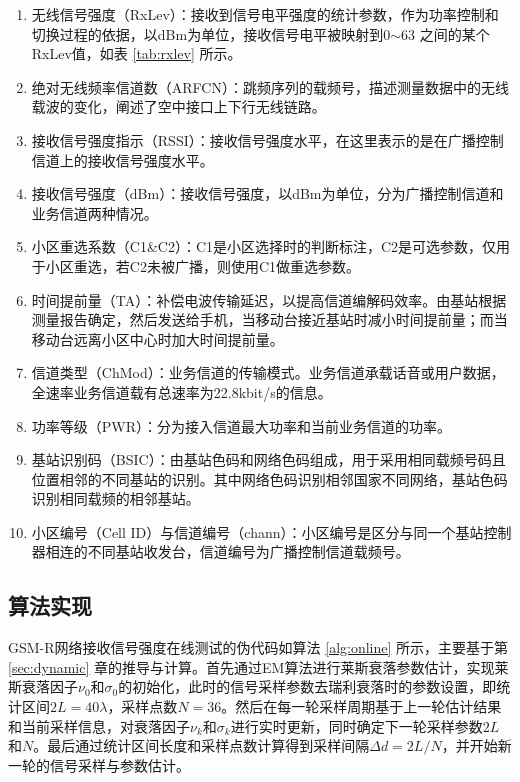\begin{enumerate}
  \item 无线信号强度（RxLev）：接收到信号电平强度的统计参数，作为功率控制和切换过程的依据，以dBm为单位，接收信号电平被映射到0$\sim$63 之间的某个RxLev值，如表 \ref{tab:rxlev} 所示。
  \item 绝对无线频率信道数（ARFCN）：跳频序列的载频号，描述测量数据中的无线载波的变化，阐述了空中接口上下行无线链路。
  \item 接收信号强度指示（RSSI）：接收信号强度水平，在这里表示的是在广播控制信道上的接收信号强度水平。
  \item 接收信号强度（dBm）：接收信号强度，以dBm为单位，分为广播控制信道和业务信道两种情况。
  \item 小区重选系数（C1\&C2）：C1是小区选择时的判断标注，C2是可选参数，仅用于小区重选，若C2未被广播，则使用C1做重选参数。
  \item 时间提前量（TA）：补偿电波传输延迟，以提高信道编解码效率。由基站根据测量报告确定，然后发送给手机，当移动台接近基站时减小时间提前量；而当移动台远离小区中心时加大时间提前量。
  \item 信道类型（ChMod）：业务信道的传输模式。业务信道承载话音或用户数据，全速率业务信道载有总速率为22.8kbit/s的信息。
  \item 功率等级（PWR）：分为接入信道最大功率和当前业务信道的功率。
  \item 基站识别码（BSIC）：由基站色码和网络色码组成，用于采用相同载频号码且位置相邻的不同基站的识别。其中网络色码识别相邻国家不同网络，基站色码识别相同载频的相邻基站。
  \item 小区编号（Cell ID）与信道编号（chann）：小区编号是区分与同一个基站控制器相连的不同基站收发台，信道编号为广播控制信道载频号。
\end{enumerate}

\subsection{算法实现}
\label{sec:alggsmr}

GSM-R网络接收信号强度在线测试的伪代码如算法 \ref{alg:online} 所示，主要基于第 \ref{sec:dynamic} 章的推导与计算。首先通过EM算法进行莱斯衰落参数估计，实现莱斯衰落因子$\nu_0$和$\sigma_0$的初始化，此时的信号采样参数去瑞利衰落时的参数设置，即统计区间$2L=40\lambda$，采样点数$N=36$。然后在每一轮采样周期基于上一轮估计结果和当前采样信息，对衰落因子$\nu_k$和$\sigma_k$进行实时更新，同时确定下一轮采样参数$2L$和$N$。最后通过统计区间长度和采样点数计算得到采样间隔$\Delta d=2L/N$，并开始新一轮的信号采样与参数估计。

